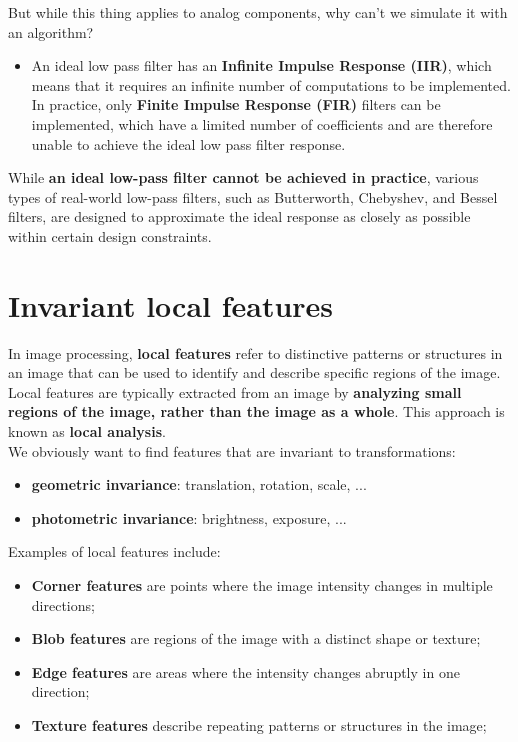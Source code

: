 \documentclass{article}
\begin{document}
But while this thing applies to analog components, why can't we simulate it with an algorithm?
\begin{itemize}
    \item An ideal low pass filter has an \textbf{Infinite Impulse Response (IIR)}, which means that it requires an infinite number of computations to be implemented. In practice, only \textbf{Finite Impulse Response (FIR)} filters can be implemented, which have a limited number of coefficients and are therefore unable to achieve the ideal low pass filter response.
\end{itemize}

While \textbf{an ideal low-pass filter cannot be achieved in practice}, various types of real-world low-pass filters, such as Butterworth, Chebyshev, and Bessel filters, are designed to approximate the ideal response as closely as possible within certain design constraints. \\

\newpage

\section*{Invariant local features}

In image processing, \textbf{local features} refer to distinctive patterns or structures in an image that can be used to identify and describe specific regions of the image. Local features are typically extracted from an image by \textbf{analyzing small regions of the image, rather than the image as a whole}. This approach is known as \textbf{local analysis}. \\

We obviously want to find features that are invariant to transformations:
\begin{itemize}
    \item \textbf{geometric invariance}: translation, rotation, scale, ...
    \item \textbf{photometric invariance}: brightness, exposure, ... 
\end{itemize}

Examples of local features include: 
\begin{itemize}
    \item \textbf{Corner features} are points where the image intensity changes in multiple directions;
    \item \textbf{Blob features} are regions of the image with a distinct shape or texture;
    \item \textbf{Edge features} are areas where the intensity changes abruptly in one direction;
    \item \textbf{Texture features} describe repeating patterns or structures in the image;
\end{itemize}
\end{document}
